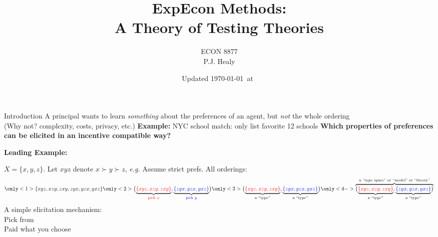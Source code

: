 

\title[Incentives in Experiments: Theory]{ExpEcon Methods:\\A Theory of Testing Theories}
\author[ECON 8877]{ECON 8877\\P.J. Healy} \color{metrop}
\institute[OSU]{}
\date[]{\vfill {\tiny Updated \today\ at\ \DTMcurrenttime}} %



\frame{\maketitle}

\begin{frame}{Introduction}{}
A principal wants to learn \emph{something} about the preferences of an agent, but \emph{not} the whole ordering\\
(Why not? complexity, costs, privacy, etc.)
\br
\textbf{Example:} NYC school match: only list favorite 12 schools
\br
\textbf{Which properties of preferences can be elicited in an incentive compatible way?}


\end{frame}

\begin{frame}{}{}
\textbf{Leading Example:}\\
\begin{center}
$X=\{x,y,z\}$. Let $xyz$ denote $x$$\succ$$y$$\succ$$z$, \textit{e.g.} Assume strict prefs.
\br
All orderings:
  $$
  \only<1>{\{xyz,xzy,zxy,zyx,yzx,yxz\}}
  \only<2>{\{\underbrace{\color{red} \{xyz,xzy,zxy\} }_{\color{red} \text{pick }x },\underbrace{\color{blue} \{zyx,yzx,yxz\} }_{\color{blue} \text{pick }y }\}}
  \only<3>{\{\underbrace{\color{red} \{xyz,xzy,zxy\} }_{ \text{a ``type''} },\underbrace{\color{blue} \{zyx,yzx,yxz\} }_{ \text{a ``type''} }\}}
  \only<4->{\overbrace{ \{\underbrace{\color{red} \{xyz,xzy,zxy\} }_{ \text{a ``type''} },\underbrace{\color{blue} \{zyx,yzx,yxz\} }_{ \text{a ``type''} }\} }^{ \text{a ``type space'' or ``model'' or ``theory''} }}
  $$
  \br
  A simple elicitation mechanism:\\
  Pick from \\
  Paid what you choose
  \br
\end{center}
\end{frame}


